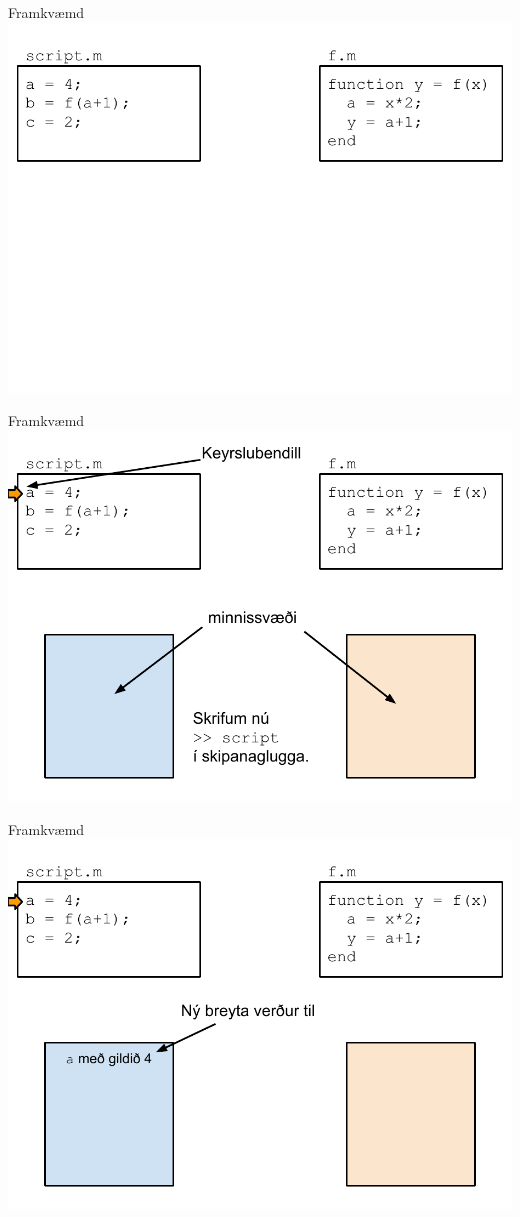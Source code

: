 \documentclass{beamer}
\begin{document}
\begin{frame}{Framkvæmd}
\includegraphics[width=\textwidth]{Pics/framkvaemd-falls-0}
\end{frame}
\begin{frame}{Framkvæmd}
\includegraphics[width=\textwidth]{Pics/framkvaemd-falls-1}
\end{frame}
\begin{frame}{Framkvæmd}
\includegraphics[width=\textwidth]{Pics/framkvaemd-falls-2}
\end{frame}
\end{document}

